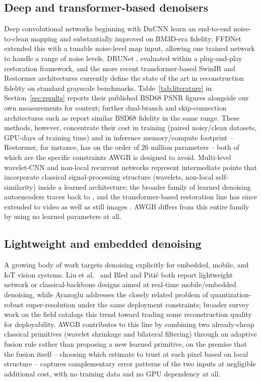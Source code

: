 \documentclass[final,3p,times,twocolumn,nopreprintline]{elsarticle}
\begin{document}
\subsection{Deep and transformer-based denoisers}
Deep convolutional networks beginning with DnCNN \cite{zhang2017beyond} learn an end-to-end noise-to-clean mapping and substantially improved on BM3D-era fidelity; FFDNet \cite{zhang2018ffdnet} extended this with a tunable noise-level map input, allowing one trained network to handle a range of noise levels. DRUNet \cite{zhang2021plug}, evaluated within a plug-and-play restoration framework, and the more recent transformer-based SwinIR \cite{liang2021swinir} and Restormer \cite{zamir2022restormer} architectures currently define the state of the art in reconstruction fidelity on standard grayscale benchmarks. Table~\ref{tab:literature} in Section~\ref{sec:results} reports their published BSD68 PSNR figures alongside our own measurements for context; further dual-branch and skip-connection architectures such as \cite{wu2023dcbdnet} report similar BSD68 fidelity in the same range. These methods, however, concentrate their cost in training (paired noisy/clean datasets, GPU-days of training time) and in inference memory/compute footprint -- Restormer, for instance, has on the order of 26 million parameters \cite{zamir2022restormer} -- both of which are the specific constraints AWGB is designed to avoid. Multi-level wavelet-CNN \cite{liu2018mwcnn} and non-local recurrent networks \cite{liu2018nlrn} represent intermediate points that incorporate classical signal-processing structure (wavelets, non-local self-similarity) inside a learned architecture; the broader family of learned denoising autoencoders traces back to \cite{vincent2008extracting}, and the transformer-based restoration line has since extended to video as well as still images \cite{liang2024vrt}. AWGB differs from this entire family by using no learned parameters at all.

\subsection{Lightweight and embedded denoising}
A growing body of work targets denoising explicitly for embedded, mobile, and IoT vision systems. Liu et al.\ \cite{liu2023lightweight} and Bled and Piti\'{e} \cite{bled2024lightweight} both report lightweight network or classical-backbone designs aimed at real-time mobile/embedded denoising, while Ayazoglu \cite{ayazoglu2021extremely} addresses the closely related problem of quantization-robust super-resolution under the same deployment constraints; broader survey work on the field \cite{fan2019brief,tian2020deep} catalogs this trend toward trading some reconstruction quality for deployability. AWGB contributes to this line by combining two already-cheap classical primitives (wavelet shrinkage and bilateral filtering) through an adaptive fusion rule rather than proposing a new learned primitive, on the premise that the fusion itself -- choosing which estimate to trust at each pixel based on local structure -- captures complementary error patterns of the two inputs at negligible additional cost, with no training data and no GPU dependency at all.
\end{document}
